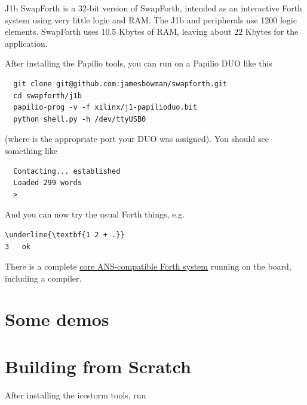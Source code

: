 J1b SwapForth is a 32-bit version of SwapForth,
intended as an interactive Forth system using very little logic and RAM.
The J1b and peripherals use 1200 logic elements.
SwapForth uses 10.5 Kbytes of RAM,
leaving about 22 Kbytes for the application. 

After installing the Papilio
tools, you can run on a
Papilio DUO
like this

\begin{framed}
\begin{Verbatim}
  git clone git@github.com:jamesbowman/swapforth.git
  cd swapforth/j1b
  papilio-prog -v -f xilinx/j1-papilioduo.bit
  python shell.py -h /dev/ttyUSB0
\end{Verbatim}
\end{framed}

\noindent
(where  is the appropriate port your DUO was assigned).
You should see something like

\begin{framed}
\begin{Verbatim}
  Contacting... established
  Loaded 299 words
  >
\end{Verbatim}
\end{framed}

And you can now try the usual Forth things, e.g.

\begin{framed}
\begin{Verbatim}[commandchars=\\\{\}]
\underline{\textbf{1 2 + .}}
3   ok
\end{Verbatim}
\end{framed}

There is a complete 
\href{http://forth.sourceforge.net/std/dpans/dpans6.htm}{core ANS-compatible Forth system}
running on the board, including a compiler.

\section{Some demos} 



\section{Building from Scratch}

After installing the icestorm tools, run

